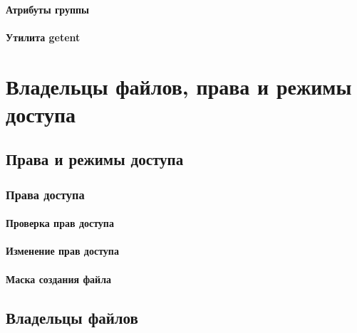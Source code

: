 \documentclass[oneside]{book}
\begin{document}
         \subsection{Атрибуты группы}
         

         \subsection{Утилита getent}
         




\clearpage \part{Владельцы файлов, права и режимы доступа}

   \chapter{Права и режимы доступа}
   

      \section{Права доступа}

         \subsection{Проверка прав доступа}
         

         \subsection{Изменение прав доступа}
         

         \subsection{Маска создания файла}
         


   \chapter{Владельцы файлов}
\end{document}
